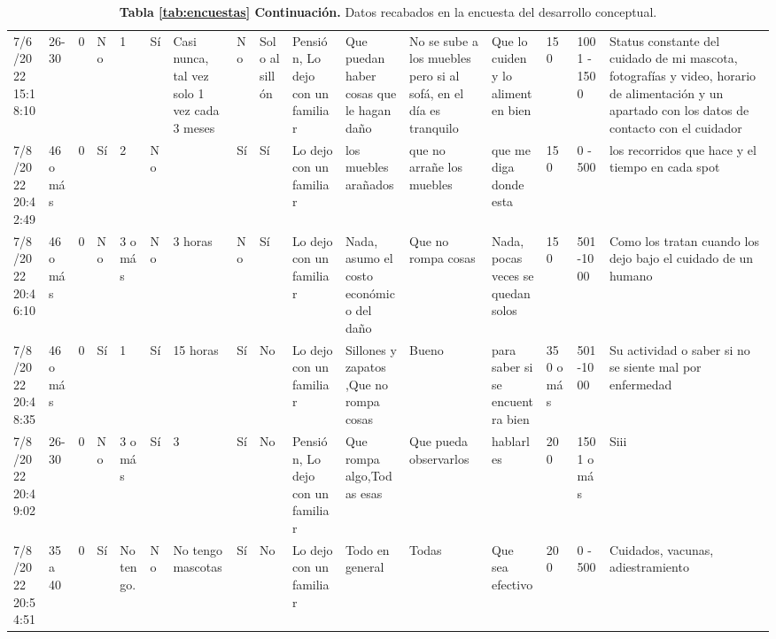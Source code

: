 \begin{landscape}
\capstartfalse
\begin{table}
    \caption*{\textbf{\textup{Tabla \ref{tab:encuestas} Continuación.}} Datos recabados en la encuesta del desarrollo conceptual.}
    \tiny
    \centering
    \begin{tabular}{
          p{0.059\lanscapetablewidth}p{0.022\lanscapetablewidth}
          p{0.056\lanscapetablewidth}p{0.010\lanscapetablewidth}
          p{0.016\lanscapetablewidth}p{0.018\lanscapetablewidth}
          p{0.03\lanscapetablewidth}p{0.02\lanscapetablewidth}
          p{0.03\lanscapetablewidth}p{0.086\lanscapetablewidth}
          p{0.108\lanscapetablewidth}p{0.125\lanscapetablewidth}
          p{0.149\lanscapetablewidth}p{0.024\lanscapetablewidth}
          p{0.041\lanscapetablewidth}p{0.206\lanscapetablewidth}
      }
      \toprule
      7/6/2022 15:18:10 & 26-30 & 0 & No & 1 & Sí & Casi nunca, tal vez solo 1 vez cada 3 meses & No & Solo al sillón & Pensión, Lo dejo con un familiar & Que puedan haber cosas que le hagan daño & No se sube a los muebles pero si al sofá, en el día es tranquilo & Que lo cuiden y lo alimenten bien & 150 & 1001 - 1500 & Status constante del cuidado de mi mascota, fotografías y video, horario de alimentación y un apartado con los datos de contacto con el cuidador\\
      7/8/2022 20:42:49 & 46 o más & 0 & Sí & 2 & No &  & Sí & Sí & Lo dejo con un familiar & los muebles arañados & que no arrañe los muebles & que me diga donde esta & 150 & 0 - 500 & los recorridos que hace y el tiempo en cada spot\\
      7/8/2022 20:46:10 & 46 o más & 0 & No & 3 o más & No & 3 horas & No & Sí & Lo dejo con un familiar & Nada, asumo el costo económico del daño & Que no rompa cosas & Nada, pocas veces se quedan solos & 150 & 501 -1000 & Como los tratan cuando los dejo bajo el cuidado de un humano\\
      7/8/2022 20:48:35 & 46 o más & 0 & Sí & 1 & Sí & 15 horas  & Sí & No & Lo dejo con un familiar & Sillones y zapatos ,Que no rompa cosas  & Bueno &  para saber si se encuentra bien  & 350 o más & 501 -1000 & Su actividad o saber si no se siente mal por enfermedad \\
      7/8/2022 20:49:02 & 26-30 & 0 & No & 3 o más & Sí & 3 & Sí & No & Pensión, Lo dejo con un familiar & Que rompa algo,Todas esas  & Que pueda observarlos &  hablarles  & 200 & 1501 o más & Siii\\
      7/8/2022 20:54:51 & 35 a 40 & 0 & Sí & No tengo. & No & No tengo mascotas & Sí & No & Lo dejo con un familiar & Todo en general & Todas & Que sea efectivo & 200 & 0 - 500 & Cuidados, vacunas, adiestramiento \\

\end{tabular}
\end{table}
\end{landscape}
